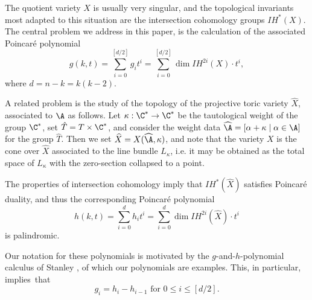 The quotient variety $ X $ is usually very singular, and the topological 
invariants most adapted to this situation are the intersection cohomology 
groups $ IH^*(X) $.  The central problem we address in this paper, is 
the calculation of the associated Poincar\'e polynomial 
\[   g(k,t)=  \sum_{i=0}^{[d/2]}g_it^i =  \sum_{i=0}^{[d/2]} \dim IH^{2i}(X)\cdot t^i, \]
where $d=n-k=k(k-2)$.


A related problem is the study of the topology of the projective toric variety 
$ \widehat{X}$,
associated to $ \A $ as follows. Let $ \kappa:\C^*\to\C^* $ be the tautological 
weight of the group $ \C^* $, set $ \hat T = T\times\C^* $, and consider 
the weight data $ \widehat{\A}= [\alpha+\kappa \mid \alpha\in \A] $ for the group $ \hat T $.
Then we set $ \widehat{X}=X(\widehat{\A},\kappa)$, and note that
the variety $ X $ is the cone over $ \widehat{X}$ 
associated to the line bundle $ L_\kappa $, i.e.  it may be obtained as the 
total space of $ L_\kappa $ with the zero-section collapsed to a point. 

The properties of intersection cohomology imply that $ IH^*(\widehat{X}) $ 
satisfies Poincar\'e duality,
and thus the corresponding Poincar\'e polynomial
\[   h(k,t)=   \sum_{i=0}^d h_it^i = \sum_{i=0}^{d} \dim IH^{2i}(\widehat{X})\cdot t^i \]
is palindromic.  


Our notation for these polynomials is motivated by the $ g$-and-$ h 
$-polynomial calculus of Stanley 
\cite{Stanley}, of which our polynomials are examples. This, in particular, 
implies~that 
\begin{equation}\label{ghrelation}
	g_i = h_i - h_{i-1}\text{ for }  0\le i \le[d/2] .
\end{equation}








